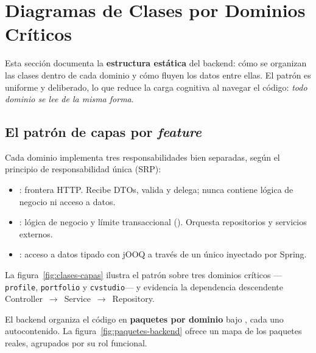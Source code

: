 \section{Diagramas de Clases por Dominios Críticos}
\label{sec:clases}

Esta sección documenta la \textbf{estructura estática} del backend: cómo se organizan las
clases dentro de cada dominio y cómo fluyen los datos entre ellas. El patrón es uniforme
y deliberado, lo que reduce la carga cognitiva al navegar el código: \textit{todo dominio
se lee de la misma forma}.

\subsection{El patrón de capas por \textit{feature}}
\label{subsec:patron_capas}

Cada dominio implementa tres responsabilidades bien separadas, según el principio de
responsabilidad única (SRP):

\begin{itemize}[noitemsep]
    \item {}: frontera HTTP. Recibe DTOs, valida y delega; nunca
    contiene lógica de negocio ni acceso a datos.
    \item {}: lógica de negocio y límite transaccional
    (). Orquesta repositorios y servicios externos.
    \item {}: acceso a datos tipado con jOOQ a través de un único
     inyectado por Spring.
\end{itemize}

La figura~\ref{fig:clases-capas} ilustra el patrón sobre tres dominios críticos
—\texttt{profile}, \texttt{portfolio} y \texttt{cvstudio}— y evidencia la dependencia
descendente Controller~$\rightarrow$~Service~$\rightarrow$~Repository.

El backend organiza el código en \textbf{paquetes por dominio} bajo
, cada uno autocontenido. La figura~\ref{fig:paquetes-backend}
ofrece un mapa de los paquetes reales, agrupados por su rol funcional.

